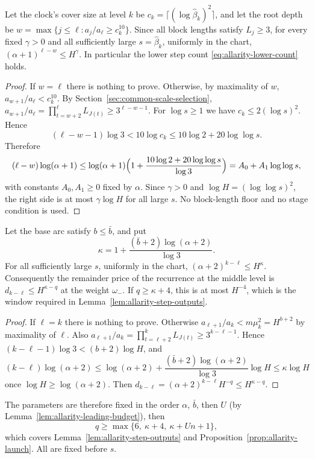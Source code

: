 \begin{lemma}
\label{lem:allarity-lower-count-free}
Let the clock's cover size at level $k$ be
$c_k=\lceil(\log\widehat\beta_k)^2\rceil$, and let the root depth be
$w=\max\{j\le\ell:a_j/a_\ell\ge c_k^{10}\}$. Since all block lengths
satisfy $L_j\ge3$, for every fixed $\gamma>0$ and all sufficiently large
$s=\widehat\beta_k$, uniformly in the chart,
$(\alpha+1)^{\ell-w}\le H^{\gamma}$. In particular the lower step count
\eqref{eq:allarity-lower-count} holds.
\end{lemma}
\begin{proof}
If $w=\ell$ there is nothing to prove. Otherwise, by maximality of $w$,
$a_{w+1}/a_\ell<c_k^{10}$. By Section~\ref{sec:common-scale-selection},
$a_{w+1}/a_\ell=\prod_{t=w+2}^{\ell}L_{J(t)}\ge3^{\ell-w-1}$. For
$\log s\ge1$ we have $c_k\le2(\log s)^2$. Hence
\[
 (\ell-w-1)\log3<10\log c_k\le10\log2+20\log\log s .
\]
Therefore
\[
 (\ell-w)\log(\alpha+1)\le\log(\alpha+1)
   \Bigl(1+\frac{10\log2+20\log\log s}{\log3}\Bigr)
 =A_0+A_1\log\log s ,
\]
with constants $A_0,A_1\ge0$ fixed by $\alpha$. Since $\gamma>0$ and
$\log H=(\log\log s)^2$, the right side is at most $\gamma\log H$ for all
large $s$. No block-length floor and no stage condition is used.
\end{proof}

\begin{lemma}
\label{lem:allarity-upper-count-power}
Let the base arc satisfy $b\le\bar b$, and put
\[
 \kappa=1+\frac{(\bar b+2)\log(\alpha+2)}{\log3}.
\]
For all sufficiently large $s$, uniformly in the chart,
$(\alpha+2)^{k-\ell}\le H^{\kappa}$. Consequently the remainder price of
the recurrence at the middle level is $d_{k-\ell}\le H^{\kappa-q}$ at the
weight $\omega_-$. If $q\ge\kappa+4$, this is at most $H^{-4}$, which is
the window required in Lemma~\ref{lem:allarity-step-outputs}.
\end{lemma}
\begin{proof}
If $\ell=k$ there is nothing to prove. Otherwise
$a_{\ell+1}/a_k<m\mu_k^2=H^{b+2}$ by maximality of $\ell$. Also
$a_{\ell+1}/a_k=\prod_{t=\ell+2}^{k}L_{J(t)}\ge3^{k-\ell-1}$. Hence
$(k-\ell-1)\log3<(b+2)\log H$, and
\[
 (k-\ell)\log(\alpha+2)\le\log(\alpha+2)
   +\frac{(\bar b+2)\log(\alpha+2)}{\log3}\log H\le\kappa\log H
\]
once $\log H\ge\log(\alpha+2)$. Then
$d_{k-\ell}=(\alpha+2)^{k-\ell}H^{-q}\le H^{\kappa-q}$.
\end{proof}

The parameters are therefore fixed in the order $\alpha$, $\bar b$, then
$U$ (by Lemma~\ref{lem:allarity-leading-budget}), then
\[
 q\ge\max\{6,\ \kappa+4,\ \kappa+Un+1\},
\]
which covers Lemma~\ref{lem:allarity-step-outputs} and
Proposition~\ref{prop:allarity-launch}. All are fixed before $s$.

